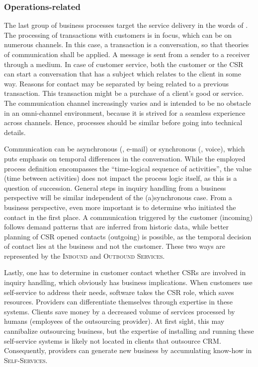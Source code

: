 	\subsubsection{Operations-related}
	The last group of business processes target the service delivery in the words of \citeauthor{schewe2007}. The processing of transactions with customers is in focus, which can be on numerous channels. In this case, a transaction is a conversation, so that theories of communication \citep{shannon1949} shall be applied. A message is sent from a sender to a receiver through a medium. In case of customer service, both the customer or the \acrshort{CSR} can start a conversation that has a subject which relates to the client in some way. Reasons for contact may be separated by being related to a previous transaction. This transaction might be a purchase of a client's good or service. The communication channel increasingly varies and is intended to be no obstacle in an omni-channel environment, because it is strived for a seamless experience across channels. Hence, processes should be similar before going into technical details. 
	
	Communication can be asynchronous (\eg, e-mail) or synchronous (\eg, voice), which puts emphasis on temporal differences in the conversation. While the employed process definition encompasses the \enquote{time-logical sequence of activities}, the value (\viz time between activities) does not impact the process logic itself, as this is a question of succession. General steps in inquiry handling from a business perspective will be similar independent of the (a)synchronous case. From a business perspective, even more important is to determine who initiated the contact in the first place. A communication triggered by the customer (incoming) follows demand patterns that are inferred from historic data, while better planning of \acrshort{CSR} opened contacts (outgoing) is possible, as the temporal decision of contact lies at the business and not the customer. These two ways are represented by the \textsc{Inbound} and \textsc{Outbound Services}.
	
	Lastly, one has to determine in customer contact whether \acrshort{CSR}s are involved in inquiry handling, which obviously has business implications. When customers use self-service to address their needs, software takes the \acrshort{CSR} role, which saves resources. Providers can differentiate themselves through expertise in these systems. Clients save money by a decreased volume of services processed by humans (employees of the outsourcing provider). At first sight, this may cannibalize outsourcing business, but the expertise of installing and running these self-service systems is likely not located in clients that outsource \acrshort{CRM}. Consequently, providers can generate new business by accumulating know-how in \textsc{Self-Services}. 
	
